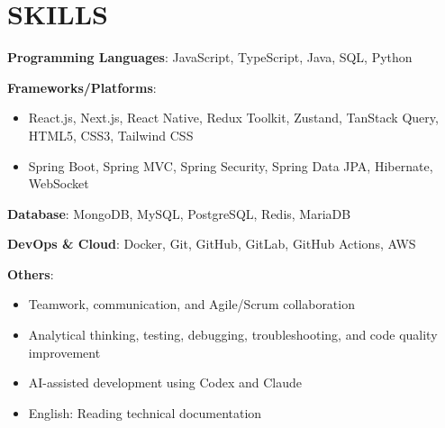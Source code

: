 \section{SKILLS}
\resumeSubHeadingListStart

  \item
    \resumeItemListStart
      \item \textbf{Programming Languages}: JavaScript, TypeScript, Java, SQL, Python
      \item \textbf{Frameworks/Platforms}:
        \begin{itemize}
          \item React.js, Next.js, React Native, Redux Toolkit, Zustand, TanStack Query, HTML5, CSS3, Tailwind CSS
          \item Spring Boot, Spring MVC, Spring Security, Spring Data JPA, Hibernate, WebSocket
        \end{itemize}
      \item \textbf{Database}: MongoDB, MySQL, PostgreSQL, Redis, MariaDB
      \item \textbf{DevOps \& Cloud}: Docker, Git, GitHub, GitLab, GitHub Actions, AWS
      \item \textbf{Others}:
        \begin{itemize}
          \item Teamwork, communication, and Agile/Scrum collaboration
          \item Analytical thinking, testing, debugging, troubleshooting, and code quality improvement
          \item AI-assisted development using Codex and Claude
          \item English: Reading technical documentation
        \end{itemize}
    \resumeItemListEnd

\resumeSubHeadingListEnd
